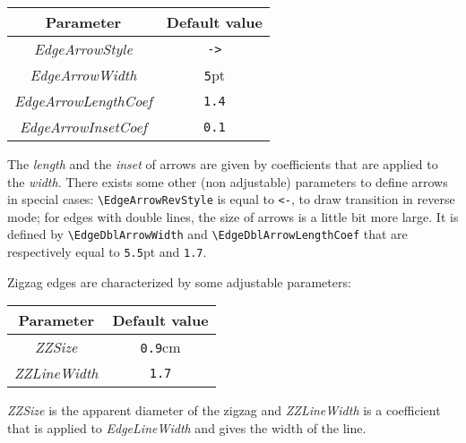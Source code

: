 \documentclass[11pt,twoside]{article}
\newcommand{\noi}{\noindent}
\begin{document}
{\begin{center}
\begin{tabular}{c|c|}
Parameter & Default value \\
\hline
\textsl{EdgeArrowStyle} & \texttt{->} \\
\hline
\textsl{EdgeArrowWidth} & \texttt{5}pt \\
\hline
\textsl{EdgeArrowLengthCoef} & \texttt{1.4}  \\
\hline
\textsl{EdgeArrowInsetCoef} & \texttt{0.1}  \\
\hline
\end{tabular}
\end{center}
%

The {\em length} and the {\em inset} of arrows are given by 
coefficients that are applied to the {\em width}. 
There exists some other (non adjustable) parameters to define arrows 
in special cases: 
\verb+\EdgeArrowRevStyle+ is equal to \texttt{<-}, to draw transition 
in reverse mode; for edges with double lines, the size of 
arrows is a little bit more large. 
It is defined by \verb+\EdgeDblArrowWidth+
and \verb+\EdgeDblArrowLengthCoef+ that are respectively equal to 
\texttt{5.5}pt and \texttt{1.7}. 

\medskip
\noi
Zigzag edges are characterized by some adjustable parameters:

\begin{center}
\begin{tabular}{c|c|}
Parameter & Default value \\
\hline
\textsl{ZZSize} & \texttt{0.9}cm \\
\hline
\textsl{ZZLineWidth} & \texttt{1.7}  \\
\hline
\end{tabular}
\end{center}

\textsl{ZZSize} is the apparent diameter of the zigzag and \textsl{ZZLineWidth}
is a coefficient that is applied to \textsl{EdgeLineWidth} and gives
the width of the line.

}
\end{document}
